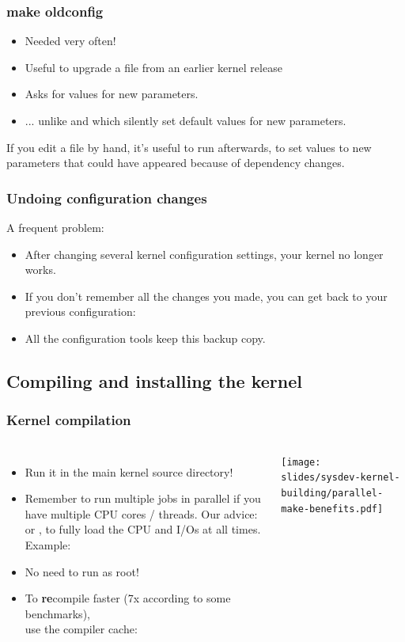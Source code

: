 \begin{frame}
  \frametitle{make oldconfig}
  \begin{itemize}
  \item Needed very often!
  \item Useful to upgrade a  file from an earlier kernel release
  \item Asks for values for new parameters.
  \item ... unlike  and  which silently set
  default values for new parameters.
  \end{itemize}
  If you edit a  file by hand, it's useful
  to run  afterwards, to set values to new
  parameters that could have appeared because of dependency changes.
\end{frame}

\begin{frame}
  \frametitle{Undoing configuration changes}
  A frequent problem:
  \begin{itemize}
  \item After changing several kernel configuration settings, your
    kernel no longer works.
  \item If you don't remember all the changes you made,
    you can get back to your previous configuration:\\
  \item All the configuration tools keep this  backup
    copy.
  \end{itemize}
\end{frame}

\subsection{Compiling and installing the kernel}

\begin{frame}[fragile]
  \frametitle{Kernel compilation}
  \begin{columns}
  \begin{itemize}
    \item Run it in the main kernel source directory!
    \item Remember to run multiple jobs in parallel
          if you have multiple CPU cores / threads. Our advice:
           or , to fully load
          the CPU and I/Os at all times.\\
          Example: 
    \item No need to run as root!
    \item To {\bf re}compile faster (7x according to some benchmarks),\\
	  use the  compiler cache:\\
  \end{itemize}
    \texttt{[image: slides/sysdev-kernel-building/parallel-make-benefits.pdf]}
  \end{columns}
\end{frame}


